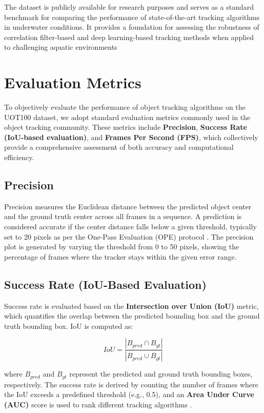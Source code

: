 The dataset is publicly available for research purposes and serves as a standard benchmark for comparing the performance of state-of-the-art tracking algorithms in underwater conditions. It provides a foundation for assessing the robustness of correlation filter-based and deep learning-based tracking methods when applied to challenging aquatic environments



\section{Evaluation Metrics}
To objectively evaluate the performance of object tracking algorithms on the UOT100 dataset, we adopt standard evaluation metrics commonly used in the object tracking community. These metrics include \textbf{Precision}, \textbf{Success Rate (IoU-based evaluation)}, and \textbf{Frames Per Second (FPS)}, which collectively provide a comprehensive assessment of both accuracy and computational efficiency.

\subsection{Precision}
Precision measures the Euclidean distance between the predicted object center and the ground truth center across all frames in a sequence. A prediction is considered accurate if the center distance falls below a given threshold, typically set to 20 pixels as per the One-Pass Evaluation (OPE) protocol \cite{wu2013online}. The precision plot is generated by varying the threshold from 0 to 50 pixels, showing the percentage of frames where the tracker stays within the given error range.

\subsection{Success Rate (IoU-Based Evaluation)}
Success rate is evaluated based on the \textbf{Intersection over Union (IoU)} metric, which quantifies the overlap between the predicted bounding box and the ground truth bounding box. IoU is computed as:

\begin{equation}
IoU = \frac{| B_{pred} \cap B_{gt} |}{| B_{pred} \cup B_{gt} |}
\end{equation}

where $ B_{pred} $ and $ B_{gt} $ represent the predicted and ground truth bounding boxes, respectively. The success rate is derived by counting the number of frames where the IoU exceeds a predefined threshold (e.g., 0.5), and an \textbf{Area Under Curve (AUC)} score is used to rank different tracking algorithms \cite{kristan2018sixth}.

